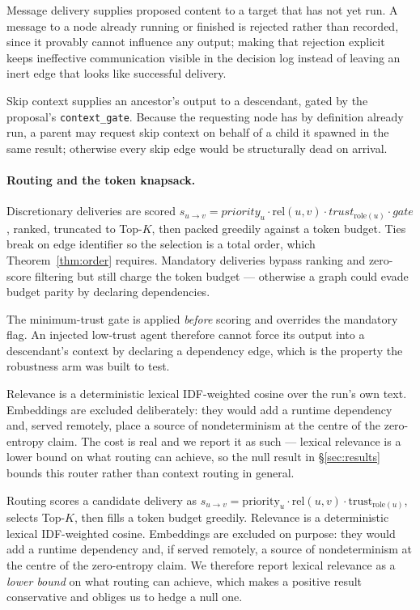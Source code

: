 \documentclass[10pt]{article}
\begin{document}
Message delivery supplies proposed content to a target that has not yet run. A
message to a node already running or finished is rejected rather than recorded,
since it provably cannot influence any output; making that rejection explicit
keeps ineffective communication visible in the decision log instead of leaving
an inert edge that looks like successful delivery.

Skip context supplies an ancestor's output to a descendant, gated by the
proposal's \texttt{context\_gate}. Because the requesting node has by definition
already run, a parent may request skip context on behalf of a child it spawned
in the same result; otherwise every skip edge would be structurally dead on
arrival.

\paragraph{Routing and the token knapsack.}
Discretionary deliveries are scored
$s_{u \rightarrow v} = \mathit{priority}_u \cdot \mathrm{rel}(u, v) \cdot
\mathit{trust}_{\mathrm{role}(u)} \cdot \mathit{gate}$, ranked, truncated to
Top-$K$, then packed greedily against a token budget. Ties break on edge
identifier so the selection is a total order, which Theorem~\ref{thm:order}
requires. Mandatory deliveries bypass ranking and zero-score filtering but still
charge the token budget --- otherwise a graph could evade budget parity by
declaring dependencies.

The minimum-trust gate is applied \emph{before} scoring and overrides the
mandatory flag. An injected low-trust agent therefore cannot force its output
into a descendant's context by declaring a dependency edge, which is the
property the robustness arm was built to test.

Relevance is a deterministic lexical IDF-weighted cosine over the run's own
text. Embeddings are excluded deliberately: they would add a runtime dependency
and, served remotely, place a source of nondeterminism at the centre of the
zero-entropy claim. The cost is real and we report it as such --- lexical
relevance is a lower bound on what routing can achieve, so the null result in
§\ref{sec:results} bounds this router rather than context routing in general.

Routing scores a candidate delivery as
$s_{u \rightarrow v} = \mathrm{priority}_u \cdot \mathrm{rel}(u,v) \cdot
\mathrm{trust}_{\mathrm{role}(u)}$, selects Top-$K$, then fills a token budget
greedily. Relevance is a deterministic lexical IDF-weighted cosine. Embeddings
are excluded on purpose: they would add a runtime dependency and, if served
remotely, a source of nondeterminism at the centre of the zero-entropy claim.
We therefore report lexical relevance as a \emph{lower bound} on what routing
can achieve, which makes a positive result conservative and obliges us to hedge
a null one.
\end{document}
